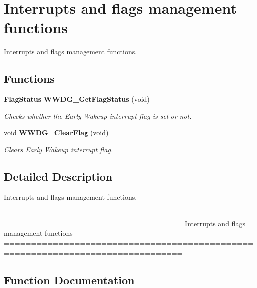 \section{Interrupts and flags management functions}
\label{group__WWDG__Group3}


Interrupts and flags management functions.  


\subsection*{Functions}
\begin{DoxyCompactItemize}
\item 
\textbf{ Flag\+Status} \textbf{ W\+W\+D\+G\+\_\+\+Get\+Flag\+Status} (void)
\begin{DoxyCompactList}\small\item\em Checks whether the Early Wakeup interrupt flag is set or not. \end{DoxyCompactList}\item 
void \textbf{ W\+W\+D\+G\+\_\+\+Clear\+Flag} (void)
\begin{DoxyCompactList}\small\item\em Clears Early Wakeup interrupt flag. \end{DoxyCompactList}\end{DoxyCompactItemize}


\subsection{Detailed Description}
Interrupts and flags management functions. 

\begin{DoxyVerb} ===============================================================================
                 Interrupts and flags management functions
 ===============================================================================  \end{DoxyVerb}
 

\subsection{Function Documentation}
\mbox{\label{group__WWDG__Group3_gabd2b5a6317c2e1a3ab0795838ce59dd2}} 

